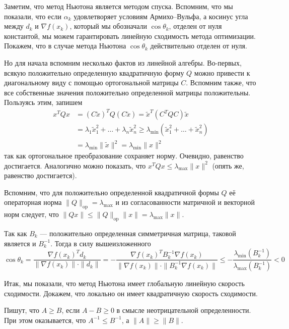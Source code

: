 \documentclass[a4paper, 12pt]{article}
\begin{document}
Заметим, что метод Ньютона является методом спуска. Вспомним, что мы показали, что если $\alpha_k$ удовлетворяет условиям Армихо--Вульфа, а косинус угла между $d_k$ и $\nabla f(x_k)$, который мы обозначали $\cos \theta_k$, отделен от нуля константой, мы можем гарантировать линейную сходимость метода оптимизации. Покажем, что в случае метода Ньютона $\cos \theta_k$ действительно отделен от нуля.

Но для начала вспомним несколько фактов из линейной алгебры. Во-первых, всякую положительно определенную квадратичную форму $Q$ можно привести к диагональному виду с помощью ортогональной матрицы $C$. Вспомним также, что все собственные значения положительно определенной матрицы положительны. Пользуясь этим, запишем 
\begin{align}
    x^TQx &= (C\tilde{x})^T Q (C\tilde{x}) = \tilde{x}^T (C^T Q C) \tilde{x} \\ &= \lambda_1 \tilde{x}_1^2 + \dots + \lambda_n \tilde{x}_n^2 \geq \lambda_{\mathrm{min}} (\tilde{x}_1^2 + \dots + \tilde{x}_n^2) \\ &= \lambda_{\mathrm{min}} \|\tilde{x}\|^2 = \lambda_{\mathrm{min}} \|x\|^2
\end{align}
так как ортогональное преобразование сохраняет норму. Очевидно, равенство достигается. Аналогично можно показать, что $x^T Q x \leq \lambda_{\mathrm{max}} \|x\|^2$ (опять же, равенство достигается).

Вспомним, что для положительно определенной квадратичной формы $Q$ её операторная норма $\|Q\|_{\mathrm{op}} = \lambda_{\mathrm{max}}$ и из согласованности матричной и векторной норм следует, что $\|Qx\| \leq \|Q\|_{\mathrm{op}} \|x\| = \lambda_{\mathrm{max}}\|x\| $.

Так как $B_k$ --- положительно определенная симметричная матрица, таковой является и $B_k^{-1}$. Тогда в силу вышеизложенного
$$
    \cos \theta_k = \frac{\nabla f(x_k)^T d_k}{\|\nabla f(x_k)\| \cdot \|d_k\|} = - \frac{\nabla f(x_k)^T B^{-1}_k \nabla f(x_k)}{\|\nabla f(x_k)\| \cdot \| B^{-1}_k \nabla f(x_k)\|} \leq -\frac{\lambda_{\mathrm{min}}(B_k^{-1})}{\lambda_{\mathrm{max}}(B_k^{-1})} < 0
$$

Итак, мы показали, что метод Ньютона имеет глобальную линейную скорость сходимости. Докажем, что локально он имеет квадратичную скорость сходимости.


Пишут, что $A \geq B$, если $A - B \geq 0$ в смысле неотрицательной определенности. При этом оказывается, что $A^{-1} \leq B^{-1}$, а $\|A\| \geq \|B\|$.
\end{document}
